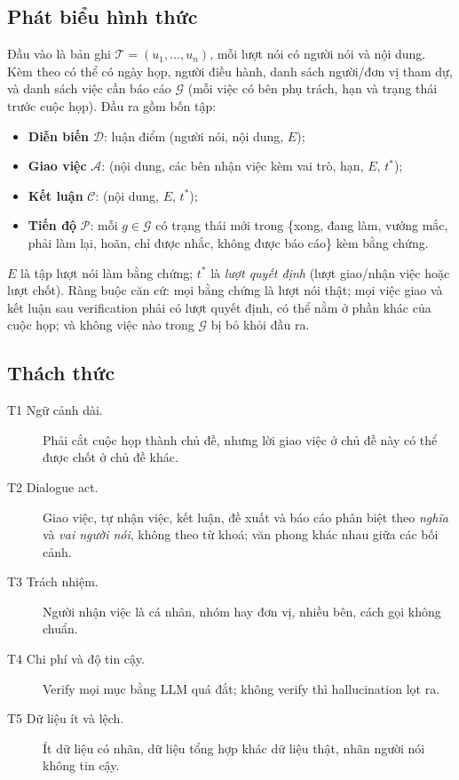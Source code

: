\documentclass[11pt]{article}
\begin{document}
\subsection{Phát biểu hình thức}

Đầu vào là bản ghi $\mathcal{T}=(u_1,\dots,u_n)$, mỗi lượt nói có người nói và nội dung. Kèm theo có thể
có ngày họp, người điều hành, danh sách người/đơn vị tham dự, và danh sách việc cần báo cáo $\mathcal{G}$
(mỗi việc có bên phụ trách, hạn và trạng thái trước cuộc họp). Đầu ra gồm bốn tập:
\begin{itemize}
  \item \textbf{Diễn biến} $\mathcal{D}$: luận điểm (người nói, nội dung, $E$);
  \item \textbf{Giao việc} $\mathcal{A}$: (nội dung, các bên nhận việc kèm vai trò, hạn, $E$, $t^{*}$);
  \item \textbf{Kết luận} $\mathcal{C}$: (nội dung, $E$, $t^{*}$);
  \item \textbf{Tiến độ} $\mathcal{P}$: mỗi $g\in\mathcal{G}$ có trạng thái mới trong \{xong, đang làm,
        vướng mắc, phải làm lại, hoãn, chỉ được nhắc, không được báo cáo\} kèm bằng chứng.
\end{itemize}
$E$ là tập lượt nói làm bằng chứng; $t^{*}$ là \emph{lượt quyết định} (lượt giao/nhận việc hoặc lượt
chốt). Ràng buộc căn cứ: mọi bằng chứng là lượt nói thật; mọi việc giao và kết luận sau verification phải
có lượt quyết định, có thể nằm ở phần khác của cuộc họp; và không việc nào trong $\mathcal{G}$ bị bỏ
khỏi đầu ra.

\subsection{Thách thức}
\begin{description}
  \item[T1 Ngữ cảnh dài.] Phải cắt cuộc họp thành chủ đề, nhưng lời giao việc ở chủ đề này có thể được
        chốt ở chủ đề khác.
  \item[T2 Dialogue act.] Giao việc, tự nhận việc, kết luận, đề xuất và báo cáo phân biệt theo
        \emph{nghĩa} và \emph{vai người nói}, không theo từ khoá; văn phong khác nhau giữa các bối cảnh.
  \item[T3 Trách nhiệm.] Người nhận việc là cá nhân, nhóm hay đơn vị, nhiều bên, cách gọi không chuẩn.
  \item[T4 Chi phí và độ tin cậy.] Verify mọi mục bằng LLM quá đắt; không verify thì hallucination lọt ra.
  \item[T5 Dữ liệu ít và lệch.] Ít dữ liệu có nhãn, dữ liệu tổng hợp khác dữ liệu thật, nhãn người nói
        không tin cậy.
\end{description}
\end{document}
